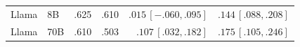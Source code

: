 \documentclass[letterpaper]{article} %
\begin{document}
\begin{table}[t]
\begin{tabular}{llrrrr}
Llama & 8B   & .625 & .610 & $.015\,[-.060,.095]$  & $.144\,[.088,.208]$ \\ %
Llama & 70B  & .610 & .503 & $.107\,[.032,.182]$   & $.175\,[.105,.246]$ \\ %
\bottomrule
\end{tabular}

\end{table}
\end{document}
